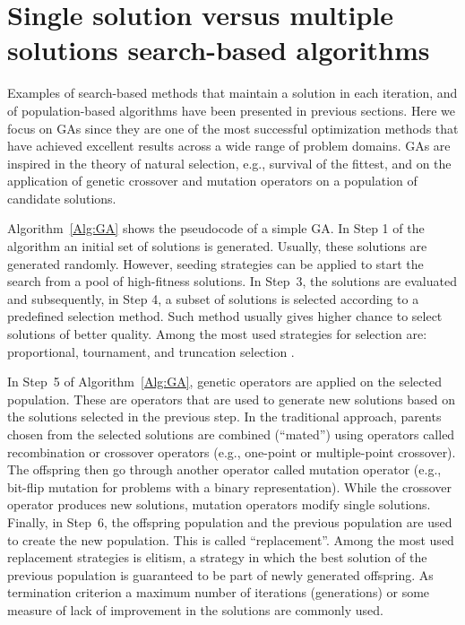  \section{Single solution versus multiple solutions search-based algorithms} \label{sec:SINGLE_VS_POP}

 Examples of search-based methods that maintain a solution in each iteration, and of population-based algorithms have been presented in previous sections. Here we focus on  GAs  \cite{Goldberg:1989} since they are  one of the most successful optimization methods that have achieved excellent results across a wide range of problem domains. GAs are inspired in the theory of natural selection, e.g., survival of the fittest, and on the application of genetic crossover and mutation operators on a population of candidate solutions.

 Algorithm~\ref{Alg:GA} shows the pseudocode of a simple GA. In Step 1 of the algorithm an initial set of solutions is generated. Usually, these solutions are generated randomly. However, seeding strategies can be applied to start the search from a pool of high-fitness solutions. In Step~3, the solutions are evaluated and subsequently, in Step 4, a subset of solutions is selected according to a predefined selection method. Such method usually gives higher chance to select solutions of better quality. Among the most used strategies for selection are: proportional, tournament, and truncation selection \cite{Blickle_and_Thiele:1996}. 

 In Step~5 of Algorithm~\ref{Alg:GA},  genetic operators are applied on the selected population. These are operators that are used to generate new solutions based on the solutions selected in the previous step.  In the traditional approach, parents chosen from the selected solutions are combined (``mated'') using operators called recombination or crossover operators (e.g., one-point or multiple-point crossover). The offspring then go through another operator called mutation operator (e.g., bit-flip mutation for problems with a binary representation).  While the crossover operator produces new solutions, mutation operators modify single solutions. Finally, in Step~6, the offspring population and the previous population are used to create the new population. This is called ``replacement''.  Among the most used replacement strategies is elitism, a strategy in which the best solution of the previous population is guaranteed to be part of newly generated offspring. As termination criterion a  maximum number of iterations (generations) or some measure of lack of improvement in the solutions are commonly used. 


